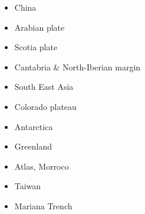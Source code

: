\begin{itemize}
\item China 
{\scriptsize
\cite{zhst10}
\cite{wazh15}
\cite{guyr16}
}
\item Arabian plate 
{\scriptsize
\cite{rerl15}
}
\item Scotia plate 
{\scriptsize
\cite{necb13}
}
\item Cantabria \& North-Iberian margin 
{\scriptsize
\cite{clbb02}
\cite{peap15}
}
\item South East Asia 
{\scriptsize
\cite{rekv04}
\cite{yotr15}\cite{hasp15}\cite{meds15}
\cite{necg16}
}
\item Colorado plateau 
{\scriptsize
\cite{vabv10}
\cite{lesm11}
}
\item Antarctica  
{\scriptsize
\cite{huha07}
}
\item Greenland  
{\scriptsize
\cite{stsj15}\cite{heps15}\cite{stbl19}
}
\item Atlas, Morroco  
{\scriptsize
\cite{kava14}
}
\item Taiwan  
{\scriptsize
\cite{chys01}\cite{liku16}
}
\item Mariana Trench  
{\scriptsize
\cite{zhlb15}
}


\end{itemize}






